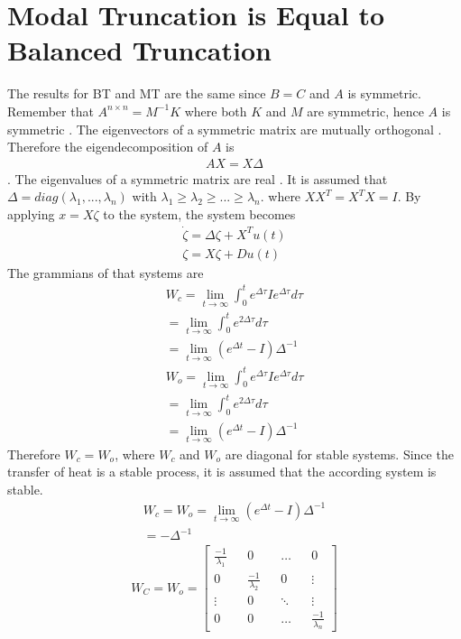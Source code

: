 \section{Modal Truncation is Equal to Balanced Truncation}
The results for BT and MT are the same since \(B = C\) and \(A\) is symmetric.
Remember that \(A^{n\times n} = M^{-1}K\) where both \(K\) and \(M\) are symmetric, hence \(A\) is symmetric \cite{170372}.
The eigenvectors of a symmetric matrix are mutually orthogonal \cite{Zhang}.
Therefore the eigendecomposition of  \(A\) is
\begin{gather}
AX = X\Delta
\end{gather}.
The eigenvalues of a symmetric matrix are real .
It is assumed that \(\Delta = diag(\lambda_1, ..., \lambda_n)\) with \(\lambda_1 \geq \lambda_2 \geq ... \geq \lambda_n\).
where \(XX^T = X^TX = I\).
By applying \(x = X\zeta\) to the system, the system becomes
\begin{gather}
\dot{\zeta} = \Delta \zeta + X^{T}u(t) \label{sys-zeta1}\\
\zeta = X\zeta + Du(t) \label{sys-zeta2}
\end{gather}
The grammians of that systems are
\begin{gather}
W_c = \lim_{t \to \infty} \int_{0}^{t} e^{\Delta\tau}Ie^{\Delta\tau}d\tau \label{gramc} \\
= \lim_{t \to \infty} \int_{0}^{t} e^{2\Delta\tau}d\tau \\
= \lim_{t \to \infty} (e^{\Delta t} - I)\Delta^{-1} \\
W_o = \lim_{t \to \infty} \int_{0}^{t} e^{\Delta\tau}Ie^{\Delta\tau}d\tau \label{gramo} \\
= \lim_{t \to \infty} \int_{0}^{t} e^{2\Delta\tau}d\tau \\
= \lim_{t \to \infty} (e^{\Delta t} - I)\Delta^{-1}
\end{gather}
Therefore \(W_c = W_o\), where \(W_c\) and \(W_o\) are diagonal for stable systems.
Since the transfer of heat is a stable process, it is assumed that the according system is stable.
\begin{gather}
W_c = W_o = \lim_{t \to \infty} (e^{\Delta t} - I)\Delta^{-1} \\
= -\Delta^{-1} 
\end{gather}
\cite{658289}
\begin{gather}
W_C = W_o = \begin{bmatrix}
\frac{-1}{\lambda_1} && 0 && \hdots && 0 \\
0 && \frac{-1}{\lambda_2}&& 0 && \vdots \\
\vdots && 0 && \ddots && \vdots \\
0 && 0 && \hdots && \frac{-1}{\lambda_n}
\end{bmatrix}
\end{gather}
